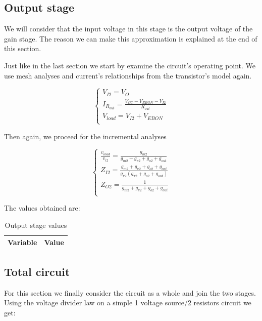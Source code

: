 \subsection{Output stage}
We will consider that the input voltage in this stage is the output voltage of the gain stage. The reason we can make this approximation is explained at the end of this section.
\par
Just like in the last section we start by examine the circuit's operating point.  We use mesh analyses and current's relationships from the transistor's model again.

\begin{equation}\label{eq:Op2}
\begin{cases}
V_{I2}=V_O\\
I_{R_{out}}= \frac{V_{CC}-V_{EBON}-V_{I2}}{R_{out}}\\
V_{load}=V_{I2}+ V_{EBON}\\
\end{cases}
\end{equation}

Then again, we proceed for the incremental analyses

\begin{equation}\label{eq:v2}
\begin{cases}
\frac{v_{load}}{v_{i2}}=\frac{g_{m2}}{g_{m2}+g_{\pi 2}+g_{o2}+g_{out}}\\
Z_{I2}= \frac{g_{m2}+g_{\pi 2}+ g_{o2}+g_{out}}{g_{\pi 2} (g_{\pi 2}+ g_{o2}+g_{out})}\\
Z_{O2}= \frac{1}{g_{m2}+g_{\pi 2}+ g_{o2}+g_{out}}\\
\end{cases}
\end{equation}

The values obtained are:

\begin{table}[H]
  \centering
  \begin{tabular}{|l|r|}
    \hline    
    {\bf Variable} & {\bf Value} \\ \hline
    
  \end{tabular}
  \caption{Output stage values}
  \label{tab:sim1}
\end{table}


\subsection{Total circuit}
For this section we finally consider the circuit as a whole and join the two stages. Using the voltage divider law on a simple 1 voltage source/2 resistors circuit we get:

